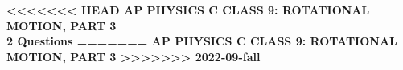 \documentclass{../../oss-apphys-exam}
\begin{document}
\genheader

\begin{center}
  \textbf{
<<<<<<< HEAD
    AP PHYSICS C CLASS 9: ROTATIONAL MOTION, PART 3\\
    2 Questions
=======
    AP PHYSICS C CLASS 9: ROTATIONAL MOTION, PART 3
>>>>>>> 2022-09-fall
  }
\end{center}

\begin{center}
\end{center}
\end{document}
